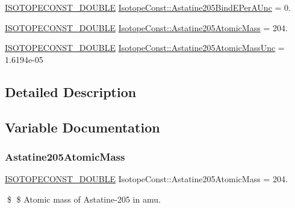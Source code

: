 \begin{DoxyCompactItemize}
\mbox{\hyperlink{group___isotope_const-_macros_ga8f45a7272ce02c0b4c65c44636ed719a}{I\+S\+O\+T\+O\+P\+E\+C\+O\+N\+S\+T\+\_\+\+D\+O\+U\+B\+LE}} \mbox{\hyperlink{group___isotope_const-_astatine-_at205_ga1bdee84815ba87487c6eeb2a819a05eb}{Isotope\+Const\+::\+Astatine205\+Bind\+E\+Per\+A\+Unc}} = 0.
\item 
\mbox{\hyperlink{group___isotope_const-_macros_ga8f45a7272ce02c0b4c65c44636ed719a}{I\+S\+O\+T\+O\+P\+E\+C\+O\+N\+S\+T\+\_\+\+D\+O\+U\+B\+LE}} \mbox{\hyperlink{group___isotope_const-_astatine-_at205_ga113a9b212a18345be9f402a3f17a105c}{Isotope\+Const\+::\+Astatine205\+Atomic\+Mass}} = 204.
\item 
\mbox{\hyperlink{group___isotope_const-_macros_ga8f45a7272ce02c0b4c65c44636ed719a}{I\+S\+O\+T\+O\+P\+E\+C\+O\+N\+S\+T\+\_\+\+D\+O\+U\+B\+LE}} \mbox{\hyperlink{group___isotope_const-_astatine-_at205_gabe72bc20053d6f6be273857b3afe8584}{Isotope\+Const\+::\+Astatine205\+Atomic\+Mass\+Unc}} = 1.\+6194e-\/05
\end{DoxyCompactItemize}


\subsection{Detailed Description}


\subsection{Variable Documentation}
\mbox{\label{group___isotope_const-_astatine-_at205_ga113a9b212a18345be9f402a3f17a105c}} 
\subsubsection{\texorpdfstring{Astatine205\+Atomic\+Mass}{Astatine205AtomicMass}}
{\footnotesize\ttfamily \mbox{\hyperlink{group___isotope_const-_macros_ga8f45a7272ce02c0b4c65c44636ed719a}{I\+S\+O\+T\+O\+P\+E\+C\+O\+N\+S\+T\+\_\+\+D\+O\+U\+B\+LE}} Isotope\+Const\+::\+Astatine205\+Atomic\+Mass = 204.}

\$ \$ Atomic mass of Astatine-\/205 in amu. \mbox{\label{group___isotope_const-_astatine-_at205_gabe72bc20053d6f6be273857b3afe8584}} 
